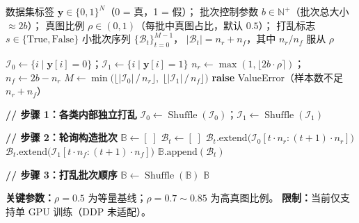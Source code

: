 \documentclass[12pt]{article}
\begin{document}
\clearpage
\begin{algorithm}[p]
\caption{BalanceBatchSampler（v1）：可控真假比例的小批次构造}
\label{alg:balance}
\begin{algorithmic}[1]
\Require
  数据集标签 $\mathbf{y} \in \{0,1\}^{N}$（0 = 真，1 = 假）；
  批次控制参数 $b \in \mathbb{N}^+$（批次总大小 $\approx 2b$）；
  真图比例 $\rho \in (0,1)$（每批中真图占比，默认 $0.5$）；
  打乱标志 $s \in \{\text{True}, \text{False}\}$
\Ensure
  小批次序列 $\{\mathcal{B}_t\}_{t=0}^{M-1}$，
  $|\mathcal{B}_t| = n_r + n_f$，其中 $n_r/n_f$ 服从 $\rho$

\State $\mathcal{I}_0 \gets \{i \mid \mathbf{y}[i] = 0\}$；\quad $\mathcal{I}_1 \gets \{i \mid \mathbf{y}[i] = 1\}$
\State $n_r \gets \max(1, \lfloor 2b \cdot \rho \rceil)$；\quad $n_f \gets 2b - n_r$
\State $M \gets \min\big(\lfloor |\mathcal{I}_0| \,/\, n_r \rfloor,\; \lfloor |\mathcal{I}_1| \,/\, n_f \rfloor\big)$
  \State \textbf{raise} ValueError（样本数不足 $n_r + n_f$）
\EndIf

\State \textbf{// 步骤 1：各类内部独立打乱}
  \State $\mathcal{I}_0 \gets \operatorname{Shuffle}(\mathcal{I}_0)$；\quad $\mathcal{I}_1 \gets \operatorname{Shuffle}(\mathcal{I}_1)$
\EndIf

\State \textbf{// 步骤 2：轮询构造批次}
\State $\mathbb{B} \gets [\;]$
  \State $\mathcal{B}_t \gets [\;]$
  \State $\mathcal{B}_t.\text{extend}\big(\mathcal{I}_0[t \cdot n_r : (t+1) \cdot n_r]\big)$ 
  \State $\mathcal{B}_t.\text{extend}\big(\mathcal{I}_1[t \cdot n_f : (t+1) \cdot n_f]\big)$ 
  \State $\mathbb{B}.\text{append}(\mathcal{B}_t)$
\EndFor

\State \textbf{// 步骤 3：打乱批次顺序}
  \State $\mathbb{B} \gets \operatorname{Shuffle}(\mathbb{B})$
\EndIf
\State \Return $\mathbb{B}$

\vspace{4pt}
\State \textbf{关键参数：}$\rho = 0.5$ 为等量基线；$\rho = 0.7\sim0.85$ 为高真图比例。
\State \textbf{限制：}当前仅支持单 GPU 训练（DDP 未适配）。
\end{algorithmic}
\end{algorithm}
\end{document}
